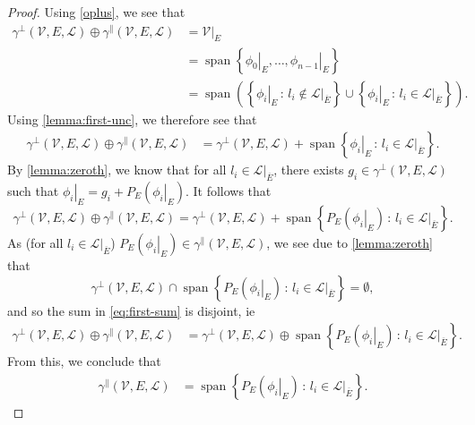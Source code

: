 \documentclass[10pt,a4paper]{amsart}
\newcommand{\closure}[1]{\overline{#1}}
\newcommand{\ctrace}[3]{\gamma^\parallel(#1,#2,#3)}
\newcommand{\dualbasis}{\mathcal{L}}
\newcommand{\polyspace}{\mathcal{V}}
\newcommand{\subentity}{E}
\newcommand{\unctrace}[3]{\gamma^\perp(#1,#2,#3)}
\begin{document}
\begin{proof}
Using \cref{oplus}, we see that
\begin{align*}
\unctrace{\polyspace}{\subentity}{\dualbasis}\oplus\ctrace{\polyspace}{\subentity}{\dualbasis}
&=\left.\polyspace\right|_{\subentity}\\
&=
\operatorname{span}\left\{\left.\phi_0\right|_{\subentity},\dots,\left.\phi_{n-1}\right|_{\subentity}\right\}\\
&=
\operatorname{span}\left(\left\{\left.\phi_i\right|_{\subentity}\,:\,l_i\not\in\left.\dualbasis\right|_{\closure{\subentity}}\right\}
\cup
\left\{\left.\phi_i\right|_{\subentity}\,:\,l_i\in\left.\dualbasis\right|_{\closure{\subentity}}\right\}\right).
\end{align*}
Using \cref{lemma:first-unc}, we therefore see that
\begin{align*}
\unctrace{\polyspace}{\subentity}{\dualbasis}\oplus\ctrace{\polyspace}{\subentity}{\dualbasis}
&=
\unctrace{\polyspace}{\subentity}{\dualbasis}
+
\operatorname{span}\left\{\left.\phi_i\right|_{\subentity}\,:\,l_i\in\left.\dualbasis\right|_{\closure{\subentity}}\right\}.
\end{align*}
By \cref{lemma:zeroth}, we know that for all $l_i\in\left.\dualbasis\right|_{\closure{\subentity}}$,
there exists $g_i\in\unctrace{\polyspace}{\subentity}{\dualbasis}$ such that
\(\left.\phi_i\right|_{\subentity}=g_i+P_{\subentity}\left(\left.\phi_i\right|_{\subentity}
\right)\). It follows that
\begin{equation}
\unctrace{\polyspace}{\subentity}{\dualbasis}\oplus\ctrace{\polyspace}{\subentity}{\dualbasis}
=
\unctrace{\polyspace}{\subentity}{\dualbasis}
+
\operatorname{span}\left\{P_{\subentity}\left(\left.\phi_i\right|_{\subentity}\right)\,:\,l_i\in\left.\dualbasis\right|_{\closure{\subentity}}\right\}.
\label{eq:first-sum}\end{equation}
As (for all $l_i\in\left.\dualbasis\right|_{\closure{\subentity}}$) $P_{\subentity}\left(\left.\phi_i\right|_{\subentity}\right)\in\ctrace{\polyspace}{\subentity}{\dualbasis}$, we see due to \cref{lemma:zeroth} that 
\[\unctrace{\polyspace}{\subentity}{\dualbasis}
\cap
\operatorname{span}\left\{P_{\subentity}\left(\left.\phi_i\right|_{\subentity}\right)\,:\,l_i\in\left.\dualbasis\right|_{\closure{\subentity}}\right\}
=\emptyset,\] and so the sum in \cref{eq:first-sum} is disjoint, ie
\begin{align*}
\unctrace{\polyspace}{\subentity}{\dualbasis}\oplus\ctrace{\polyspace}{\subentity}{\dualbasis}
&=
\unctrace{\polyspace}{\subentity}{\dualbasis}
\oplus
\operatorname{span}\left\{P_{\subentity}\left(\left.\phi_i\right|_{\subentity}\right)\,:\,l_i\in\left.\dualbasis\right|_{\closure{\subentity}}\right\}.
\end{align*}
From this, we conclude that
\begin{align*}
\ctrace{\polyspace}{\subentity}{\dualbasis}
&=
\operatorname{span}\left\{P_{\subentity}\left(\left.\phi_i\right|_{\subentity}\right)\,:\,l_i\in\left.\dualbasis\right|_{\closure{\subentity}}\right\}.
\end{align*}
\end{proof}
\end{document}
